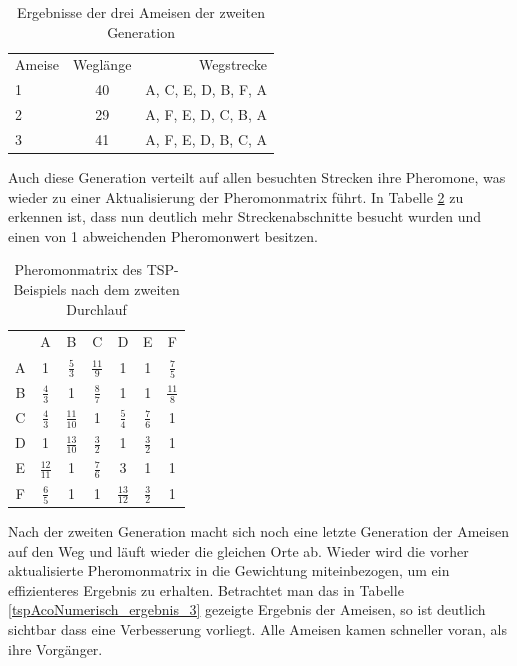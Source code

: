 	\begin{table}
		\centering
		\footnotesize
		\begin{tabular}{l c r}
			Ameise & Weglänge & Wegstrecke \\
			1 & 40 & A, C, E, D, B, F, A\\
			2 & 29 & A, F, E, D, C, B, A\\ 
			3 & 41 & A, F, E, D, B, C, A\\
		\end{tabular}
		\caption{Ergebnisse der drei Ameisen der zweiten Generation}
		\label{tspAcoNumerisch_ergebnis_2}
	\end{table}
	
	Auch diese Generation verteilt auf allen besuchten Strecken ihre Pheromone, was wieder zu einer Aktualisierung der Pheromonmatrix führt. In Tabelle \ref{tspAcoNumerisch_pheromon_2} zu erkennen ist, dass nun deutlich mehr Streckenabschnitte besucht wurden und einen von 1 abweichenden Pheromonwert besitzen.
	
	\begin{table}
		\centering
		\footnotesize
		\begin{tabular}{c c c c c c c}
			& A & B & C & D & E & F \\
			A & 1 & $\frac{5}{3}$ & $\frac{11}{9}$ & 1 & 1 & $\frac{7}{5}$\\ 
			B & $\frac{4}{3}$ & 1 & $\frac{8}{7}$ & 1 & 1 & $\frac{11}{8}$\\ 
			C & $\frac{4}{3}$ & $\frac{11}{10}$ & 1 & $\frac{5}{4}$ & $\frac{7}{6}$ & 1\\
			D & 1 & $\frac{13}{10}$ & $\frac{3}{2}$ & 1 & $\frac{3}{2}$ & 1\\
			E & $\frac{12}{11}$ & 1 & $\frac{7}{6}$ & 3 & 1 & 1\\
			F & $\frac{6}{5}$ & 1 & 1 & $\frac{13}{12}$ & $\frac{3}{2}$ & 1\\
		\end{tabular}
		\caption{Pheromonmatrix des \ac{TSP}-Beispiels nach dem zweiten Durchlauf}
		\label{tspAcoNumerisch_pheromon_2}
	\end{table}

	Nach der zweiten Generation macht sich noch eine letzte Generation der Ameisen auf den Weg und läuft wieder die gleichen Orte ab. Wieder wird die vorher aktualisierte Pheromonmatrix in die Gewichtung miteinbezogen, um ein effizienteres Ergebnis zu erhalten. Betrachtet man das in Tabelle \ref{tspAcoNumerisch_ergebnis_3} gezeigte Ergebnis der Ameisen, so ist deutlich sichtbar dass eine Verbesserung vorliegt. Alle Ameisen kamen schneller voran, als ihre Vorgänger. 
	
